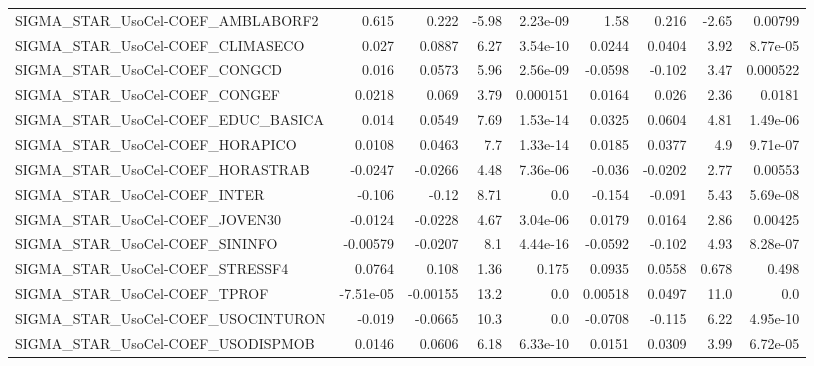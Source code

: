 \begin{tabular}{lrrrrrrrr}
SIGMA\_STAR\_UsoCel-COEF\_AMBLABORF2     &       0.615 &        0.222 &    -5.98 & 2.23e-09 &       1.58 &       0.216 &        -2.65 &       0.00799 \\
SIGMA\_STAR\_UsoCel-COEF\_CLIMASECO      &       0.027 &       0.0887 &     6.27 & 3.54e-10 &     0.0244 &      0.0404 &         3.92 &      8.77e-05 \\
SIGMA\_STAR\_UsoCel-COEF\_CONGCD         &       0.016 &       0.0573 &     5.96 & 2.56e-09 &    -0.0598 &      -0.102 &         3.47 &      0.000522 \\
SIGMA\_STAR\_UsoCel-COEF\_CONGEF         &      0.0218 &        0.069 &     3.79 & 0.000151 &     0.0164 &       0.026 &         2.36 &        0.0181 \\
SIGMA\_STAR\_UsoCel-COEF\_EDUC\_BASICA    &       0.014 &       0.0549 &     7.69 & 1.53e-14 &     0.0325 &      0.0604 &         4.81 &      1.49e-06 \\
SIGMA\_STAR\_UsoCel-COEF\_HORAPICO       &      0.0108 &       0.0463 &      7.7 & 1.33e-14 &     0.0185 &      0.0377 &          4.9 &      9.71e-07 \\
SIGMA\_STAR\_UsoCel-COEF\_HORASTRAB      &     -0.0247 &      -0.0266 &     4.48 & 7.36e-06 &     -0.036 &     -0.0202 &         2.77 &       0.00553 \\
SIGMA\_STAR\_UsoCel-COEF\_INTER          &      -0.106 &        -0.12 &     8.71 &      0.0 &     -0.154 &      -0.091 &         5.43 &      5.69e-08 \\
SIGMA\_STAR\_UsoCel-COEF\_JOVEN30        &     -0.0124 &      -0.0228 &     4.67 & 3.04e-06 &     0.0179 &      0.0164 &         2.86 &       0.00425 \\
SIGMA\_STAR\_UsoCel-COEF\_SININFO        &    -0.00579 &      -0.0207 &      8.1 & 4.44e-16 &    -0.0592 &      -0.102 &         4.93 &      8.28e-07 \\
SIGMA\_STAR\_UsoCel-COEF\_STRESSF4       &      0.0764 &        0.108 &     1.36 &    0.175 &     0.0935 &      0.0558 &        0.678 &         0.498 \\
SIGMA\_STAR\_UsoCel-COEF\_TPROF          &   -7.51e-05 &     -0.00155 &     13.2 &      0.0 &    0.00518 &      0.0497 &         11.0 &           0.0 \\
SIGMA\_STAR\_UsoCel-COEF\_USOCINTURON    &      -0.019 &      -0.0665 &     10.3 &      0.0 &    -0.0708 &      -0.115 &         6.22 &      4.95e-10 \\
SIGMA\_STAR\_UsoCel-COEF\_USODISPMOB     &      0.0146 &       0.0606 &     6.18 & 6.33e-10 &     0.0151 &      0.0309 &         3.99 &      6.72e-05 \\

\end{tabular}
